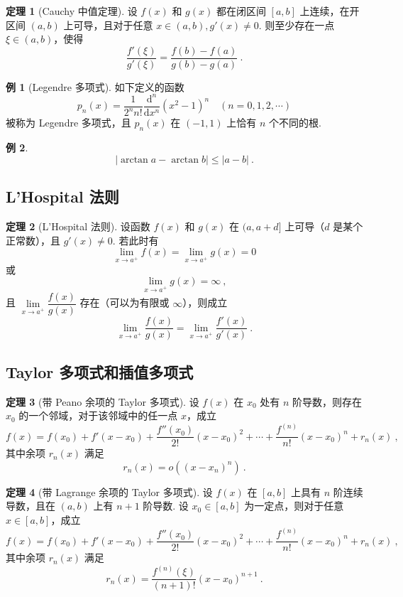 \documentclass[zihao=-4,linespread=1.8,UTF8,nothm]{aytony_base}
\theoremstyle{definition}
\newtheorem{theorem}{\indent\heiti\textbf{定理}}[subsection]
\newtheorem{example}{\indent\heiti\textbf{例}}[subsection]
\begin{document}
\begin{theorem}[Cauchy 中值定理]
    设 $f(x)$ 和 $g(x)$ 都在闭区间 $[a, b]$ 上连续，在开区间 $(a, b)$ 上可导，且对于任意 $x\in (a, b),g'(x) \neq 0$. 则至少存在一点 $\xi \in (a, b)$，使得 $$
        \dfrac{f'(\xi)}{g'(\xi)} = \dfrac{f(b) - f(a)}{g(b) - g(a)}\ .
    $$
\end{theorem}

\begin{example}[Legendre 多项式]
    如下定义的函数 $$
        p_n(x) = \dfrac{1}{2^nn!}\dfrac{\mathrm{d}^n}{\mathrm{d}x^n}(x^2 - 1)^n\quad (n= 0, 1, 2, \cdots)
    $$ 被称为 Legendre 多项式，且 $p_n(x)$ 在 $(-1, 1)$ 上恰有 $n$ 个不同的根.
\end{example}

\setcounter{example}{2}
\begin{example}
    $$
        |\arctan a - \arctan b| \leqslant |a - b|\ .
    $$
\end{example}

\subsection{L'Hospital 法则}
\begin{theorem}[L'Hospital 法则]
    设函数 $f(x)$ 和 $g(x)$ 在 $(a, a+d]$ 上可导（$d$ 是某个正常数），且 $g'(x) \neq 0$. 若此时有 $$
        \lim\limits_{x \to a^+} f(x)= \lim\limits_{x \to a^+} g(x) = 0
    $$ 或 $$
        \lim\limits_{x \to a^+} g(x) = \infty\ ,
    $$ 且 $\lim\limits_{x \to a^+} \dfrac{f(x)}{g(x)}$ 存在（可以为有限或 $\infty$），则成立 $$
        \lim\limits_{x \to a^+} \dfrac{f(x)}{g(x)} = \lim\limits_{x \to a^+} \dfrac{f'(x)}{g'(x)}\ .
    $$
\end{theorem}

\subsection{Taylor 多项式和插值多项式}

\begin{theorem}[带 Peano 余项的 Taylor 多项式]
    设 $f(x)$ 在 $x_0$ 处有 $n$ 阶导数，则存在 $x_0$ 的一个邻域，对于该邻域中的任一点 $x$，成立 $$
        f(x) = f(x_0) + f'(x - x_0) + \dfrac{f''(x_0)}{2!}(x-x_0)^2 + \cdots + \dfrac{f ^{(n)}}{n!}(x-x_0)^n + r_n(x)\ ,
    $$ 其中余项 $r_n(x)$ 满足 $$
        r_n(x) = o((x - x_n)^n)\ .
    $$
\end{theorem}

\begin{theorem}[带 Lagrange 余项的 Taylor 多项式]
    设 $f(x)$ 在 $[a, b]$ 上具有 $n$ 阶连续导数，且在 $(a, b)$ 上有 $n+1$ 阶导数. 设 $x_0 \in [a, b]$ 为一定点，则对于任意 $x \in [a, b]$，成立 $$
        f(x) = f(x_0) + f'(x - x_0) + \dfrac{f''(x_0)}{2!}(x-x_0)^2 + \cdots + \dfrac{f ^{(n)}}{n!}(x-x_0)^n + r_n(x)\ ,
    $$ 其中余项 $r_n(x)$ 满足 $$
        r_n(x) = \dfrac{f ^{(n)}(\xi)}{(n+1)!}(x - x_0)^{n+1}\ .
    $$
\end{theorem}
\end{document}
